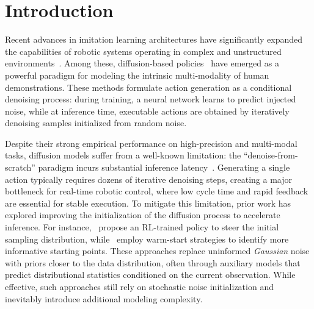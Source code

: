 \section{Introduction}


Recent advances in imitation learning architectures have significantly expanded the capabilities of robotic systems operating in complex and unstructured environments~\citep{ai2025review}. Among these, diffusion-based policies~\citep{ddpm, flowmatching, dp, intelligence2025pi} have emerged as a powerful paradigm for modeling the intrinsic multi-modality of human demonstrations. These methods formulate action generation as a conditional denoising process: during training, a neural network learns to predict injected noise, while at inference time, executable actions are obtained by iteratively denoising samples initialized from random noise.



Despite their strong empirical performance on high-precision and multi-modal tasks, diffusion models suffer from a well-known limitation: the ``denoise-from-scratch'' paradigm incurs substantial inference latency~\citep{pan2025much}. Generating a single action typically requires dozens of iterative denoising steps, creating a major bottleneck for real-time robotic control, where low cycle time and rapid feedback are essential for stable execution.
To mitigate this limitation, prior work has explored improving the initialization of the diffusion process to accelerate inference. For instance,~\citet{steeringdp} propose an RL-trained policy to steer the initial sampling distribution, while~\citet{warmstarts} employ warm-start strategies to identify more informative starting points. These approaches replace uninformed \textit{Gaussian} noise with priors closer to the data distribution, often through auxiliary models that predict distributional statistics conditioned on the current observation. While effective, such approaches still rely on stochastic noise initialization and inevitably introduce additional modeling complexity.

